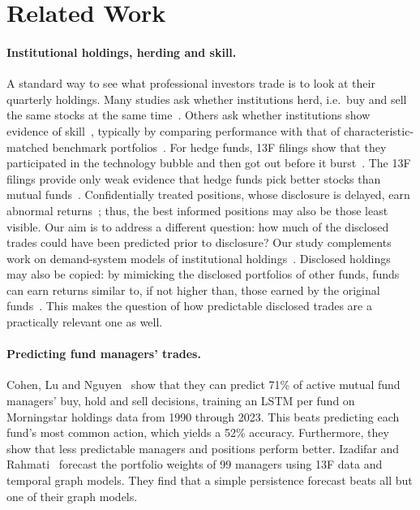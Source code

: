 \section{Related Work}

\paragraph{Institutional holdings, herding and skill.}
A standard way to see what professional investors trade is to look at their
quarterly holdings. Many studies ask whether institutions herd, i.e.\ buy and
sell the same stocks at the same time~\cite{lakonishok1992impact,
wermers1999herding, sias2004herding}. Others ask whether institutions show
evidence of skill~\cite{chen2000value}, typically by comparing performance
with that of characteristic-matched benchmark
portfolios~\cite{daniel1997measuring}. For hedge funds, 13F filings show that
they participated in the technology bubble and then got out before it
burst~\cite{brunnermeier2004bubble}. The 13F filings provide only weak
evidence that hedge funds pick better stocks than mutual
funds~\cite{griffin2009smart}. Confidentially treated positions, whose
disclosure is delayed, earn abnormal returns~\cite{agarwal2013hide,
aragon2013confidential}; thus, the best informed positions may also be those
least visible. Our aim is to address a different question: how much of the
disclosed trades could have been predicted prior to disclosure? Our study
complements work on demand-system models of institutional
holdings~\cite{koijen2019demand}. Disclosed holdings may also be copied: by
mimicking the disclosed portfolios of other funds, funds can earn returns
similar to, if not higher than, those earned by the original
funds~\cite{frank2004copycat, verbeek2013copycat}. This makes the question of
how predictable disclosed trades are a practically relevant one as well.

\paragraph{Predicting fund managers' trades.}
Cohen, Lu and Nguyen~\cite{cohen2026mimicking} show that they can predict
71\% of active mutual fund managers' buy, hold and sell decisions, training an
LSTM per fund on Morningstar holdings data from 1990 through 2023. This beats
predicting each fund's most common action, which yields a 52\% accuracy.
Furthermore, they show that less predictable managers and positions perform
better. Izadifar and Rahmati~\cite{izadifar2026holdings} forecast the
portfolio weights of 99 managers using 13F data and temporal graph models.
They find that a simple persistence forecast beats all but one of their graph
models.

